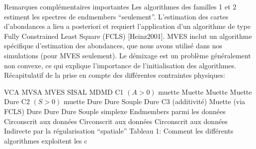 Remarques complémentaires importantes Les algorithmes des familles 1
et 2 estiment les spectres de endmembers ``seulement''. L'estimation
des cartes d'abondances a lieu a posteriori et requiert l'application
d'un algorithme de type Fully Constrained Least Square (FCLS)
[Heinz2001]. MVES inclut un algorithme spécifique d'estimation des
abondances, que nous avons utilisé dans nos simulations (pour MVES
seulement).  Le démixage est un problème généralement non convexe, ce
qui explique l'importance de l'initialisation des algorithmes.
Récapitulatif de la prise en compte des différentes contraintes
physiques:

VCA MVSA MVES SISAL MDMD C1 $(A>0)$ muette Muette Muette Muette Dure C2
$(S>0)$ muette Dure Dure Souple Dure C3 (additivité) Muette (via FCLS)
Dure Dure Dure Souple simplexe Endmembers parmi les données
Circonscrit aux données Circonscrit aux données Circonscrit aux
données Indirecte par la régularisation ``spatiale'' Tableau 1:
Comment les différents algorithmes exploitent les c


